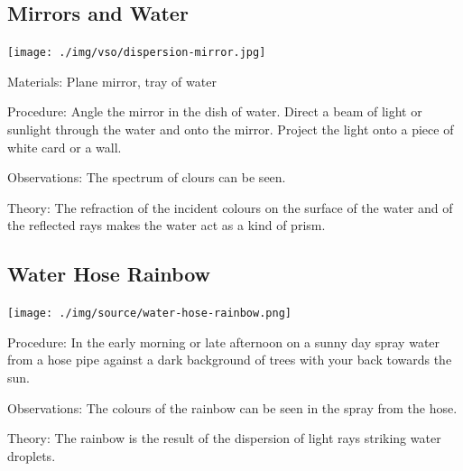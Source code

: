 \begin{multicols}{2}
\columnbreak

\subsection{Mirrors and Water}

\begin{center}
\texttt{[image: ./img/vso/dispersion-mirror.jpg]}
\end{center}

\begin{description*}
\item[Materials:]{Plane mirror, tray of water}
\item[Procedure:]{Angle the mirror in the dish of water. Direct a beam of light or sunlight through the water and onto the mirror. Project the light onto a piece of white card or a wall.}
\item[Observations:]{The spectrum of clours can be seen.}
\item[Theory:]{The refraction of the incident colours on the surface of the water and of the reflected rays makes the water act as a kind of prism.}
\end{description*}

\subsection{Water Hose Rainbow}

\begin{center}
\texttt{[image: ./img/source/water-hose-rainbow.png]}
\end{center}

\begin{description*}
\item[Procedure:]{In the early morning or late afternoon on a sunny day spray water from a hose pipe against a dark background of trees with your back towards the sun.}
\item[Observations:]{The colours of the rainbow can be seen in the spray from the hose.}
\item[Theory:]{The rainbow is the result of the dispersion of light rays striking water droplets.}
\end{description*}


\end{multicols}

